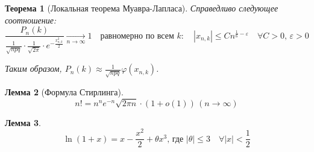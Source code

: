\documentclass[11pt,openany,a4paper]{scrartcl}
\theoremstyle{plain}
\newtheorem{theorem}{Теорема}[subsection]
\newtheorem{lemma}[theorem]{Лемма}
\theoremstyle{definition}
\newcommand{\underto}[1]{\xrightarrow[#1]{}}
\begin{document}
\begin{theorem}[Локальная теорема Муавра-Лапласа]
    Справедливо следующее соотношение:
    $$
    \frac{P_n(k)}{\frac{1}{\sqrt{npq}}\cdot \frac{1}{\sqrt{2\pi}}\cdot
    e^{-\frac{x_{n,k}^2}{2}}} \underto{n \to \infty} 1\quad \text{равномерно по всем } k:\quad
    |x_{n,k}|\leqslant Cn^{\frac{1}{6}-\varepsilon}\quad \forall C>0,\, \varepsilon > 0
    $$
    
    Таким образом, $P_n(k) \approx \frac{1}{\sqrt{npq}}\varphi(x_{n,k})$.
\end{theorem}
\begin{lemma}[Формула Стирлинга]
    $$
    n! = n^n e^{-n} \sqrt{2\pi n}\cdot(1 + o(1))\, (n \to \infty)
    $$
\end{lemma}
\begin{lemma}\label{laplacetheoremlemma2}
    $$
    \ln(1+x) = x - \frac{x^2}{2} + \theta x^3\text{, где } |\theta| \leqslant 3
    \quad\forall |x| < \frac{1}{2}
    $$
\end{lemma}
\end{document}

